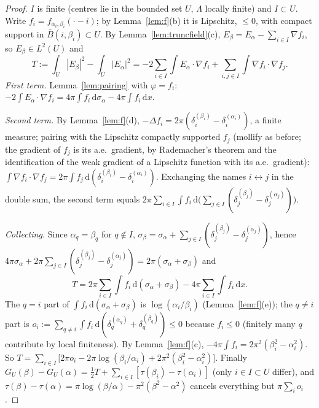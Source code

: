 \documentclass[11pt]{article}
\theoremstyle{definition}
\theoremstyle{remark}
\newcommand{\dd}{\,\mathrm d}
\newcommand{\Lam}{\Lambda}
\begin{document}
\begin{proof}
$I$ is finite (centres lie in the bounded set $U$, $\Lam$ locally finite) and $I\subset U$.  Write $f_i=f_{\alpha_i,\beta_i}(\cdot-i)$; by
Lemma~\ref{lem:f}(b) it is Lipschitz, $\le0$, with compact support in $\bar B(i,\beta_i)\subset U$.  By
Lemma~\ref{lem:truncfield}(c), $E_\beta=E_\alpha-\sum_{i\in I}\nabla f_i$, so $E_\beta\in L^2(U)$ and
\[
T:=\int_U|E_\beta|^2-\int_U|E_\alpha|^2=-2\sum_{i\in I}\int E_\alpha\cdot\nabla f_i+\sum_{i,j\in I}\int\nabla f_i\cdot\nabla f_j .
\]
\emph{First term.}  Lemma~\ref{lem:pairing} with $\varphi=f_i$: $-2\int E_\alpha\cdot\nabla f_i=4\pi\int f_i\dd\sigma_\alpha-4\pi\int f_i\dd x$.

\emph{Second term.}  By Lemma~\ref{lem:f}(d), $-\Delta f_i=2\pi(\delta_i^{(\beta_i)}-\delta_i^{(\alpha_i)})$, a finite measure; pairing with the Lipschitz compactly
supported $f_j$ (mollify as before; the gradient of $f_j$ is its a.e.\ gradient, by Rademacher's theorem and the identification of the weak gradient of a Lipschitz function with its a.e.\ gradient): $\int\nabla f_i\cdot\nabla f_j=2\pi\int f_j\dd(\delta_i^{(\beta_i)}-\delta_i^{(\alpha_i)})$.
Exchanging the names $i\leftrightarrow j$ in the double sum, the second term equals
$2\pi\sum_{i\in I}\int f_i\dd\bigl(\sum_{j\in I}(\delta_j^{(\beta_j)}-\delta_j^{(\alpha_j)})\bigr)$.

\emph{Collecting.}  Since $\alpha_q=\beta_q$ for $q\notin I$, $\sigma_\beta=\sigma_\alpha+\sum_{j\in I}(\delta_j^{(\beta_j)}-\delta_j^{(\alpha_j)})$, hence
$4\pi\sigma_\alpha+2\pi\sum_{j\in I}(\delta^{(\beta_j)}_j-\delta^{(\alpha_j)}_j)=2\pi(\sigma_\alpha+\sigma_\beta)$ and
\[
T=2\pi\sum_{i\in I}\int f_i\dd(\sigma_\alpha+\sigma_\beta)-4\pi\sum_{i\in I}\int f_i\dd x .
\]
The $q=i$ part of $\int f_i\dd(\sigma_\alpha+\sigma_\beta)$ is $\log(\alpha_i/\beta_i)$ (Lemma~\ref{lem:f}(e)); the $q\ne i$ part is
$o_i:=\sum_{q\ne i}\int f_i\dd(\delta_q^{(\alpha_q)}+\delta_q^{(\beta_q)})\le0$ because $f_i\le0$ (finitely many $q$
contribute by local finiteness).  By Lemma~\ref{lem:f}(c), $-4\pi\int f_i=2\pi^2(\beta_i^2-\alpha_i^2)$.  So
$T=\sum_{i\in I}\bigl[2\pi o_i-2\pi\log(\beta_i/\alpha_i)+2\pi^2(\beta_i^2-\alpha_i^2)\bigr]$.  Finally
$G_U(\beta)-G_U(\alpha)=\tfrac12T+\sum_{i\in I}[\tau(\beta_i)-\tau(\alpha_i)]$ (only $i\in I\subset U$ differ), and
$\tau(\beta)-\tau(\alpha)=\pi\log(\beta/\alpha)-\pi^2(\beta^2-\alpha^2)$ cancels everything but $\pi\sum_io_i$.
\end{proof}
\end{document}
